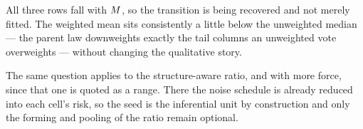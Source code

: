

\noindent All three rows fall with $M$, so the transition is being recovered and not merely
fitted. The weighted mean sits consistently a little below the unweighted median --- the parent
law downweights exactly the tail columns an unweighted vote overweights --- without changing the
qualitative story.



The same question applies to the structure-aware ratio, and with more force, since that one is
quoted as a range. There the noise schedule is already reduced into each cell's risk, so the seed
is the inferential unit by construction and only the forming and pooling of the ratio remain
optional.



